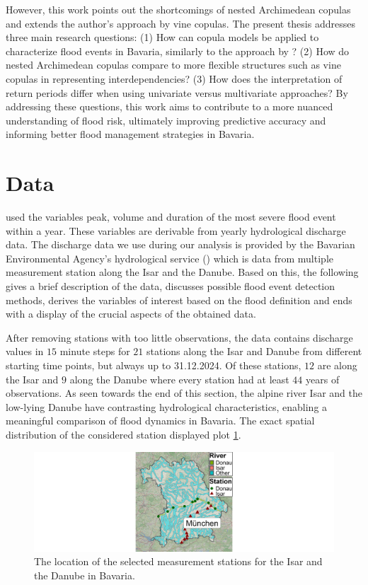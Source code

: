 \documentclass[
]{krantz}
\begin{document}
However, this work points out the shortcomings of nested Archimedean copulas and extends the author's approach
by vine copulas.
The present thesis addresses three main research questions:
(1) How can copula models be applied to characterize flood events in Bavaria, similarly to the approach by \citet{grimaldi2006}?
(2) How do nested Archimedean copulas compare to more flexible structures such as vine copulas in representing interdependencies?
(3) How does the interpretation of return periods differ when using univariate versus multivariate approaches?
By addressing these questions, this work aims to contribute to a more nuanced understanding of flood risk, ultimately improving predictive accuracy and informing better flood management strategies in Bavaria.

\section{Data}\label{data_ff}

\citet{grimaldi2006} used the variables peak, volume and duration
of the most severe flood event within a year.
These variables are derivable from yearly hydrological discharge data.
The discharge data we use during our analysis
is provided by the
Bavarian Environmental Agency's hydrological service (\citet{gkd2025}) which
is data from multiple measurement station along the Isar and the Danube.
Based on this, the following
gives a brief description of the data,
discusses possible flood event detection methods,
derives the variables of interest based on the flood definition and
ends with a display of the crucial aspects of the obtained data.

After removing stations with too little observations,
the data contains discharge values in \(15\) minute steps for
\(21\) stations along the Isar and Danube from different starting time points, but always up to 31.12.2024.
Of these stations, \(12\) are along the Isar and \(9\) along the Danube where every station had at least \(44\) years of observations.
As seen towards the end of this section, the alpine river Isar and the low-lying Danube have contrasting
hydrological characteristics, enabling a meaningful comparison of flood dynamics in Bavaria.
The exact spatial distribution of the considered station displayed plot \ref{fig:bavaria}.

\begin{figure}

{\centering \includegraphics[width=0.7\linewidth]{work/04-floodfreq/figures/data_bavaria_plot} 

}

\caption{The location of the selected measurement stations for the Isar and the Danube in Bavaria.}\label{fig:bavaria}
\end{figure}
\end{document}
